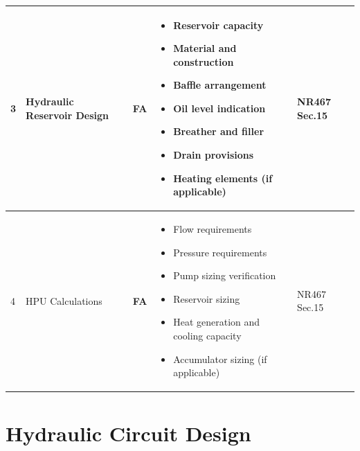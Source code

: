 \documentclass[11pt,a4paper]{report}
\newcommand{\fa}{\textbf{\textcolor{warningred}{FA}}}
\begin{document}
\begin{longtable}{|p{0.5cm}|p{5cm}|p{1.5cm}|p{5.5cm}|p{2cm}|}
3 & Hydraulic Reservoir Design & \fa{} & 
\begin{itemize}[leftmargin=*,nosep]
\item Reservoir capacity
\item Material and construction
\item Baffle arrangement
\item Oil level indication
\item Breather and filler
\item Drain provisions
\item Heating elements (if applicable)
\end{itemize} & NR467 Sec.15 \\
\hline

4 & HPU Calculations & \fa{} & 
\begin{itemize}[leftmargin=*,nosep]
\item Flow requirements
\item Pressure requirements
\item Pump sizing verification
\item Reservoir sizing
\item Heat generation and cooling capacity
\item Accumulator sizing (if applicable)
\end{itemize} & NR467 Sec.15 \\
\hline

\end{longtable}

\section{Hydraulic Circuit Design}
\end{document}
